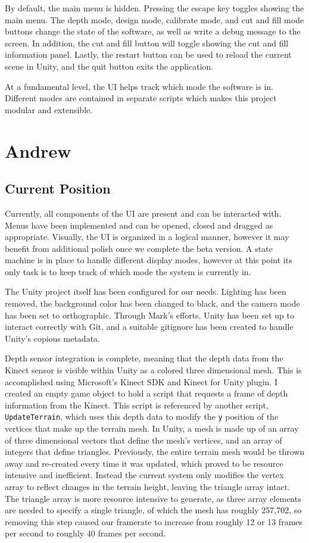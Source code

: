 \documentclass[onecolumn, draftclsnofoot,10pt, compsoc]{IEEEtran}
\begin{document}
By default, the main menu is hidden.
Pressing the escape key toggles showing the main menu.
The depth mode, design mode, calibrate mode, and cut and fill mode buttons change the state of the software, as well as write a debug message to the screen.
In addition, the cut and fill button will toggle showing the cut and fill information panel.
Lastly, the restart button can be used to reload the current scene in Unity, and the quit button exits the application.

\par At a fundamental level, the UI helps track which mode the software is in.
Different modes are contained in separate scripts which makes this project modular and extensible.


\section{Andrew}

\subsection{Current Position} 
Currently, all components of the UI are present and can be interacted with. Menus have been implemented and can be opened, closed and dragged as appropriate. Visually, the UI is organized in a logical manner, however it may benefit from additional polish once we complete the beta version. A state machine is in place to handle different display modes, however at this point its only task is to keep track of which mode the system is currently in.

The Unity project itself has been configured for our needs. Lighting has been removed, the background color has been changed to black, and the camera mode has been set to orthographic. Through Mark's efforts, Unity has been set up to interact correctly with Git, and a suitable gitignore has been created to handle Unity's copious metadata.

Depth sensor integration is complete, meaning that the depth data from the Kinect sensor is visible within Unity as a colored three dimensional mesh. This is accomplished using Microsoft's Kinect SDK and Kinect for Unity plugin. I created an empty game object to hold a script that requests a frame of depth information from the Kinect. This script is referenced by another script, \texttt{UpdateTerrain}, which uses this depth data to modify the \texttt{y} position of the vertices that make up the terrain mesh. In Unity, a mesh is made up of an array of three dimensional vectors that define the mesh's vertices, and an array of integers that define triangles. Previously, the entire terrain mesh would be thrown away and re-created every time it was updated, which proved to be resource intensive and inefficient. Instead the current system only modifies the vertex array to reflect changes in the terrain height, leaving the triangle array intact. The triangle array is more resource intensive to generate, as three array elements are needed to specify a single triangle, of which the mesh has roughly 257,702, so removing this step caused our framerate to increase from roughly 12 or 13 frames per second to roughly 40 frames per second.
\end{document}
